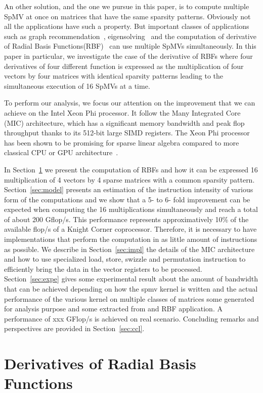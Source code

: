 \documentclass[10pt,conference,compsocconf]{IEEEtran}
\begin{document}
An other solution, and the one we pursue in this paper, is to compute
multiple SpMV at once on matrices that have the same sparsity
patterns. Obviously not all the applications have such a property. But
important classes of applications such as graph
recommendation~\cite{}, eigensolving~\cite{} and the computation of
derivative of Radial Basis Functions(RBF)~\cite{} can use multiple
SpMVs simultaneously. In this paper in particular, we investigate the
case of the derivative of RBFs where four derivatives of four
different function is expressed as the multiplication of four vectors
by four matrices with identical sparsity patterns leading to the
simultaneous execution of 16 SpMVs at a time.

To perform our analysis, we focus our attention on the improvement
that we can achieve on the Intel Xeon Phi processor. It follow the
Many Integrated Core (MIC) architecture, which has a significant
memory bandwidth and peak flop throughput thanks to its 512-bit large
SIMD registers. The Xeon Phi processor has been shown to be promising
for sparse linear algebra compared to more classical CPU or GPU
architecture~\cite{}.

In Section~\ref{sec:rbf} we present the computation of RBFs and how it
can be expressed 16 multiplication of 4 vectors by 4 sparse matrices
with a common sparsity pattern. Section~\ref{sec:model} presents an
estimation of the instruction intensity of various form of the
computations and we show that a 5- to 6- fold improvement can be
expected when computing the 16 multiplications simultaneously and
reach a total of about 200 Gflop/s. This performance represents
approximatively 10\% of the available flop/s of a Knight Corner
coprocessor. Therefore, it is necessary to have implementations that
perform the computation in as little amount of instructions as
possible. We describe in Section~\ref{sec:impl} the details of the MIC
architecture and how to use specialized load, store, swizzle and
permutation instruction to efficiently bring the data in the vector
registers to be processed. Section~\ref{sec:expe} gives some
experimental result about the amount of bandwidth that can be achieved
depending on how the spmv kernel is written and the actual performance
of the various kernel on multiple classes of matrices some generated
for analysis purpose and some extracted from and RBF application. A
performance of xxx GFlop/s is achieved on real scenario. Concluding
remarks and perspectives are provided in Section~\ref{sec:ccl}.

\section{Derivatives of Radial Basis Functions}
\label{sec:rbf}
\end{document}
